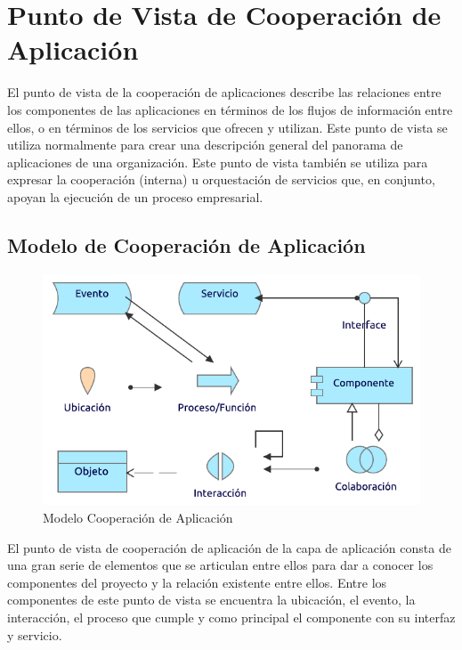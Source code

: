 \section{Punto de Vista de Cooperación de Aplicación}

El punto de vista de la cooperación de aplicaciones describe las relaciones entre los componentes de las aplicaciones en términos de los flujos de información entre ellos, o en términos de los servicios que ofrecen y utilizan. Este punto de vista se utiliza normalmente para crear una descripción general del panorama de aplicaciones de una organización. Este punto de vista también se utiliza para expresar la cooperación (interna) u orquestación de servicios que, en conjunto, apoyan la ejecución de un proceso empresarial.

\subsection{Modelo de Cooperación de Aplicación}
\begin{figure}[h!]
	\centering
	\includegraphics[width=.8\linewidth]{imgs/modelo/CoopAplicacion}
	\caption{Modelo Cooperación de Aplicación}
\end{figure}

El punto de vista de cooperación de aplicación de la capa de aplicación consta de una gran serie de elementos que se articulan entre ellos para dar a conocer los componentes del proyecto y la relación existente entre ellos. Entre los componentes de este punto de vista se encuentra la ubicación, el evento, la interacción, el proceso que cumple y como principal el componente con su interfaz y servicio.

\newpage

